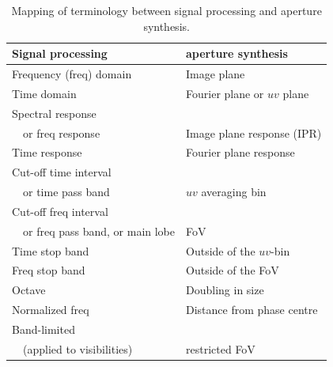 \documentclass[useAMS,usenatbib]{mn2e}
\begin{document}
\begin{table}
\centering
\begin{tabular}{l|l}
\hline
 \bf Signal processing & \bf aperture synthesis\\
\hline\hline
Frequency (freq) domain & Image plane \\
Time domain & Fourier plane or $uv$ plane \\
Spectral response\\
~~or freq response & Image plane response (IPR)\\
Time response & Fourier plane response\\
Cut-off time interval  \\
~~or time pass band & $uv$ averaging bin\\
Cut-off freq interval \\
~~or freq pass band, or main lobe & FoV\\
Time stop band & Outside of the $uv$-bin\\
Freq stop band & Outside of the FoV\\
Octave & Doubling in size\\
Normalized freq & Distance from phase centre \\
Band-limited \\
~~(applied to visibilities) & restricted FoV \\
\hline \hline
\end{tabular}
\caption{Mapping of terminology between signal processing and aperture synthesis.}
\label{tab:terms}
\end{table}
\end{document}
